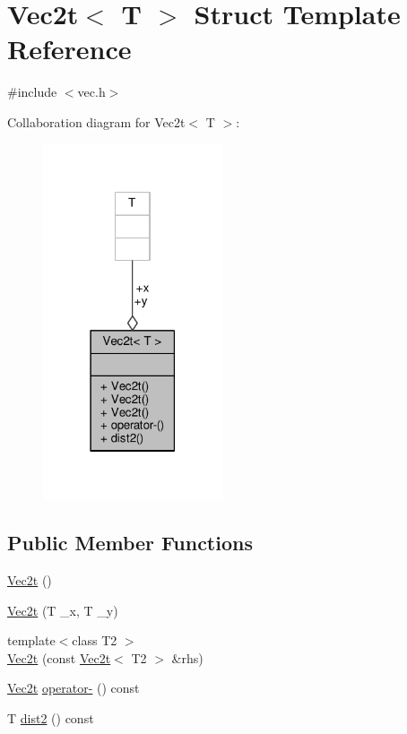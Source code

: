 \hypertarget{structVec2t}{}\section{Vec2t$<$ T $>$ Struct Template Reference}
\label{structVec2t}


{\ttfamily \#include $<$vec.\+h$>$}



Collaboration diagram for Vec2t$<$ T $>$\+:\nopagebreak
\begin{figure}[H]
\begin{center}
\leavevmode
\includegraphics[width=150pt]{structVec2t__coll__graph}
\end{center}
\end{figure}
\subsection*{Public Member Functions}
\begin{DoxyCompactItemize}
\item 
\hyperlink{structVec2t_a6f9932f3a20db459c57d3be2d593a3a7}{Vec2t} ()
\item 
\hyperlink{structVec2t_a41fc85a32a9b215f05b9297c55528ff7}{Vec2t} (T \+\_\+x, T \+\_\+y)
\item 
{\footnotesize template$<$class T2 $>$ }\\\hyperlink{structVec2t_a4e9175daa9b5fa681594a409b2028a2e}{Vec2t} (const \hyperlink{structVec2t}{Vec2t}$<$ T2 $>$ \&rhs)
\item 
\hyperlink{structVec2t}{Vec2t} \hyperlink{structVec2t_a68504c899d03bf6fe08fd2581ec7bbb7}{operator-\/} () const 
\item 
T \hyperlink{structVec2t_a93ad4ffde1d4e300aa99565092df2d7b}{dist2} () const 
\end{DoxyCompactItemize}
